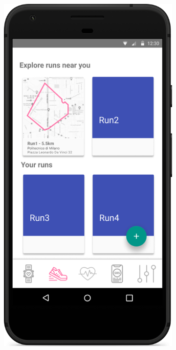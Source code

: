 \documentclass[../main.tex]{subfiles}
\begin{document}
\begin{figure}[H]
	\centering
	\begin{subfigure}[b]{0.45\linewidth}
		\includegraphics[width=\linewidth]{images/mockup/Track4Run.png}

\end{subfigure}
\end{figure}
\end{document}
